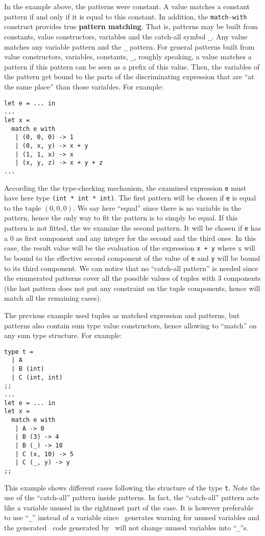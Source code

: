 \medskip In the example above, the patterns were constant. A value
matches a constant pattern if and only if it is equal to this
constant.  In addition, the
{\tt match-with} construct provides true {\bf pattern matching}. That
is, patterns may be built from constants, value constructors,
variables and the catch-all symbol {\tt \_}. Any value matches any
variable pattern and the {\tt \_} pattern. For general patterns built
from value constructors, variables, constants, {\tt \_}, roughly
speaking, a value matches a pattern if this pattern can be seen as a
prefix of this value. Then, the variables of the pattern get bound to
the parts of the discriminating expression that are ``at the same
place'' than those variables. For example:

{\scriptsize
\begin{lstlisting}
let e = ... in
...
let x =
  match e with
   | (0, 0, 0) -> 1
   | (0, x, y) -> x + y
   | (1, 1, x) -> x
   | (x, y, z) -> x + y + z
...
\end{lstlisting}
}
According the the type-checking mechanism, the examined expression
{\tt e} must have here type {\tt (int * int * int)}. The first pattern
will be chosen if {\tt e} is  equal to the tuple $(0, 0, 0)$. We
say here ``equal'' since there is no variable in the pattern, hence
the only way to fit the pattern is to simply  be equal. If this pattern
is not fitted, the we examine the second pattern. It will be chosen if
{\tt e} has a $0$ as first component and any integer for the second
and the third ones. In this case, the result value will be the
evaluation of the expression {\tt x + y} where x will be bound to the
effective second component of the value of {\tt e} and {\tt y} will be
bound to its third component. We can notice that no ``catch-all pattern''
is needed since the enumerated patterns cover all the possible values
of tuples with 3 components (the last pattern does not put
any constraint on the tuple components, hence will match all the
remaining cases).

The previous example used tuples as matched expression and patterns,
but patterns also contain sum type value constructors, hence allowing
to ``match'' on any sum type structure. For example: {\scriptsize
\begin{lstlisting}
type t =
  | A
  | B (int)
  | C (int, int)
;;
...
let e = ... in
let x =
  match e with
   | A -> 0
   | B (3) -> 4
   | B (_) -> 10
   | C (x, 10) -> 5
   | C (_, y) -> y
;;
\end{lstlisting}
} %
This example shows different cases following the structure of the type
{\tt t}. Note the use of the ``catch-all'' pattern
inside  patterns. In fact, the ``catch-all'' pattern acts like
a variable  unused in the rightmost part of the
case. It is however preferable to use ``{\tt \_}'' instead of a
variable since \ocaml\ generates warning for unused variables and the
generated \ocaml\ code generated by \focal\ will not change unused
variables into ``{\tt \_}''s.


